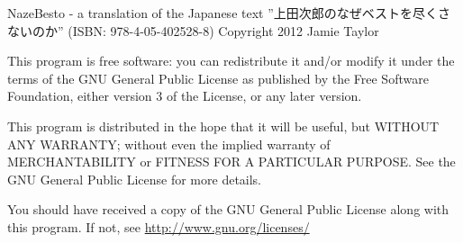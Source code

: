 NazeBesto - a translation of the Japanese text ”上田次郎のなぜベストを尽くさないのか” (ISBN: 978-4-05-402528-8) Copyright 2012 Jamie Taylor
\par This program is free software: you can redistribute it and/or modify it under the terms of the GNU General Public License as published by the Free Software Foundation, either version 3 of the License, or any later version.
\par This program is distributed in the hope that it will be useful, but WITHOUT ANY WARRANTY; without even the implied warranty of MERCHANTABILITY or FITNESS FOR A PARTICULAR PURPOSE.  See the GNU General Public License for more details.
\par You should have received a copy of the GNU General Public License along with this program.  If not, see \href{http://www.gnu.org/licenses/}{http://www.gnu.org/licenses/}